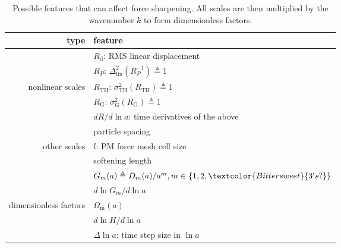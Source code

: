 \documentclass[modern, trackchanges, dvipsnames]{aastex631}
\renewcommand{\d}{d}
\newcommand{\lna}{\ln\!a}
\newcommand{\Omegam}{\Omega_\mathrm{m}}
\newcommand{\linear}{\mathrm{lin}}
\newcommand{\tophat}{\mathrm{TH}}
\newcommand{\gauss}{\mathrm{G}}
\newcommand{\YL}[1]{\textcolor{Bittersweet}{#1}}
\begin{document}
\begin{table}
  \centering
  \caption{Possible features that can affect force sharpening.
  All scales are then multiplied by the wavenumber $k$ to form dimensionless
  factors.}
  \label{tab:feat}
  \begin{tabular}{rl}
  \toprule
  type & feature \\
  \midrule
  & $R_\mathrm{d}$: RMS linear displacement \\
  \cmidrule(lr){2-2}
  & $R_P$: $\Delta_\linear^2(R_P^{-1}) \triangleq 1$ \\
  \cmidrule(lr){2-2}
  nonlinear scales & $R_\tophat$: $\sigma_\tophat^2(R_\tophat) \triangleq 1$ \\
  \cmidrule(lr){2-2}
  & $R_\gauss$: $\sigma_\gauss^2(R_\gauss) \triangleq 1$ \\
  \cmidrule(lr){2-2}
  & $\d R / \d\lna$: time derivatives of the above \\
  \midrule
  & particle spacing \\
  \cmidrule(lr){2-2}
  other scales & $l$: PM force mesh cell size \\
  \cmidrule(lr){2-2}
  & softening length \\
  \midrule
  & $G_m(a) \triangleq D_m(a) / a^m, m \in \{1, 2, \YL{3's?}\}$ \\
  \cmidrule(lr){2-2}
  & $\d\ln G_m / \d\lna$ \\
  \cmidrule(lr){2-2}
  dimensionless factors & $\Omegam(a)$ \\
  \cmidrule(lr){2-2}
  & $\d\ln\!H / \d\lna$ \\
  \cmidrule(lr){2-2}
  & $\Delta\lna$: time step size in $\lna$ \\
  \bottomrule
  \end{tabular}
  \end{table}
\end{document}
